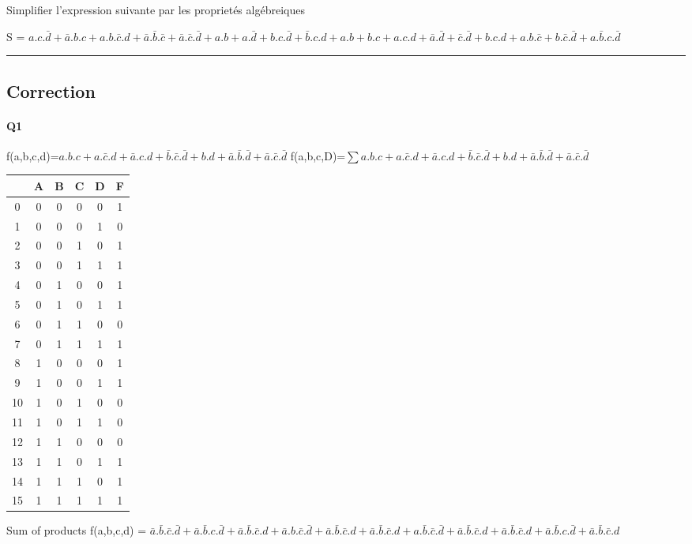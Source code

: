 Simplifier l'expression suivante par les proprietés algébreiques 

S = $a.c.\bar d+\bar a.b.c+a.b.\bar c.d+\bar a.\bar b.\bar c+\bar a.\bar c.\bar d + a.b+a.\bar d+b.c.\bar d+\bar b.c.d + a.b+b.c+a.c.d+\bar a.\bar d+\bar c.\bar d + b.c.d+a.b.\bar c+b.\bar c.\bar d+a.\bar b.c.\bar d$

\hrule width 1\linewidth\pagebreak
\subsection{Correction}

\paragraph{Q1}

f(a,b,c,d)=$a.b.c+a.\bar c.d+\bar a.c.d+\bar b.\bar c.\bar d + b.d+\bar a.\bar b.\bar d+\bar a.\bar c.\bar d$
f(a,b,c,D)=$ \sum a.b.c+a.\bar c.d+\bar a.c.d+\bar b.\bar c.\bar d + b.d+\bar a.\bar b.\bar d+\bar a.\bar c.\bar d $ 

        \begin{tabular}{|c|c|c|c|c||c|}
    \toprule
         & A & B & C & D & F\\ \midrule0 & 0 & 0 & 0 & 0 & 1\\1 & 0 & 0 & 0 & 1 & 0\\2 & 0 & 0 & 1 & 0 & 1\\3 & 0 & 0 & 1 & 1 & 1\\\midrule4 & 0 & 1 & 0 & 0 & 1\\5 & 0 & 1 & 0 & 1 & 1\\6 & 0 & 1 & 1 & 0 & 0\\7 & 0 & 1 & 1 & 1 & 1\\\midrule8 & 1 & 0 & 0 & 0 & 1\\9 & 1 & 0 & 0 & 1 & 1\\10 & 1 & 0 & 1 & 0 & 0\\11 & 1 & 0 & 1 & 1 & 0\\\midrule12 & 1 & 1 & 0 & 0 & 0\\13 & 1 & 1 & 0 & 1 & 1\\14 & 1 & 1 & 1 & 0 & 1\\15 & 1 & 1 & 1 & 1 & 1\\\bottomrule
        \end{tabular}
        
Sum of products 
 f(a,b,c,d) = $\bar a.\bar b.\bar c.\bar d + \bar a.\bar b.c.\bar d + \bar a.\bar b.\bar c.d + \bar a.b.\bar c.\bar d + \bar a.\bar b.\bar c.d + \bar a.\bar b.\bar c.d + a.\bar b.\bar c.\bar d + \bar a.\bar b.\bar c.d + \bar a.\bar b.\bar c.d + \bar a.\bar b.c.\bar d + \bar a.\bar b.\bar c.d$

